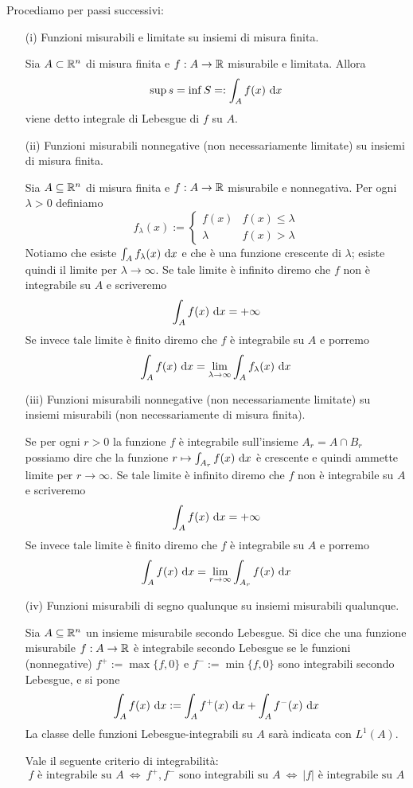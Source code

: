 Procediamo per passi successivi:
\begin{enumerate}
    \item [(i)] Funzioni misurabili e limitate su insiemi di misura finita.

    \begin{defn}
    Sia $A\subset\mathbb{R}^n$ di misura finita e $f:A\to\mathbb{R}$ misurabile e limitata. Allora
    $$
    \sup s = \inf S =:\int_A f(x) \  \mathrm{d} x
    $$
    viene detto integrale di Lebesgue di $f$ su $A$.
    \end{defn}

    \item [(ii)] Funzioni misurabili nonnegative (non necessariamente limitate) su insiemi di misura finita.

    Sia $A\subseteq\mathbb{R}^n$ di misura finita e $f:A\to\mathbb{R}$ misurabile e nonnegativa. Per ogni $\lambda>0$ definiamo
    $$
    f_\lambda(x):=\begin{cases}
    f(x) &f(x)\leq\lambda \\
    \lambda &f(x)>\lambda
    \end{cases}
    $$
    Notiamo che esiste $\int_A f_\lambda(x)\  \mathrm{d} x$ e che è una funzione crescente di $\lambda$; esiste quindi il limite per $\lambda\to\infty$. Se tale limite è infinito diremo che $f$ non è integrabile su $A$ e scriveremo
    $$
    \int_A f(x)\  \mathrm{d} x=+\infty
    $$
    Se invece tale limite è finito diremo che $f$ è integrabile su $A$ e porremo
    $$
    \int_A f(x)\  \mathrm{d} x=\lim_{\lambda\to\infty}\int_A f_\lambda(x) \  \mathrm{d} x
    $$
    \item [(iii)] Funzioni misurabili nonnegative (non necessariamente limitate) su insiemi misurabili (non necessariamente di misura finita).

    Se per ogni $r>0$ la funzione $f$ è integrabile sull'insieme $A_r=A\cap B_r$ possiamo dire che la funzione $r\mapsto\int_{A_r}f(x)\  \mathrm{d} x$ è crescente e quindi ammette limite per $r\to\infty$. Se tale limite è infinito diremo che $f$ non è integrabile su $A$ e scriveremo
    $$
    \int_A f(x)\  \mathrm{d} x=+\infty
    $$
    Se invece tale limite è finito diremo che $f$ è integrabile su $A$ e porremo
    $$
    \int_A f(x)\  \mathrm{d} x=\lim_{r\to\infty}\int_{A_r} f(x) \  \mathrm{d} x
    $$

    \item [(iv)] Funzioni misurabili di segno qualunque su insiemi misurabili qualunque.

    \begin{defn}
    Sia $A\subseteq \mathbb{R}^n$ un insieme misurabile secondo Lebesgue. Si dice che una funzione misurabile $f:A\to\mathbb{R}$ è integrabile secondo Lebesgue se le funzioni (nonnegative) $f^+:=\max\{f,0\}$ e $f^-:=\min\{f,0\}$ sono integrabili secondo Lebesgue, e si pone
    $$
    \int_A f(x)\  \mathrm{d} x:=\int_A f^+(x)\  \mathrm{d} x+\int_A f^-(x)\  \mathrm{d} x
    $$
    La classe delle funzioni Lebesgue-integrabili su $A$ sarà indicata con $L^1(A)$.
    \end{defn}

    Vale il seguente criterio di integrabilità:
    $$
    f\text{ è integrabile su }A\ \Leftrightarrow\ f^+,f^-\text{ sono integrabili su }A\ \Leftrightarrow\ |f|\text{ è integrabile su }A
    $$
    
\end{enumerate}

